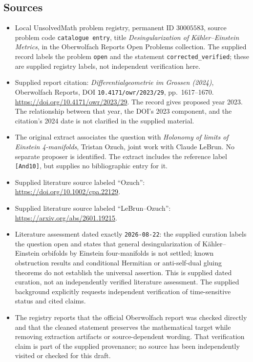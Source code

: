 \documentclass[11pt]{article}
\begin{document}
\subsection{Sources}
\begin{itemize}
\item Local UnsolvedMath problem registry, permanent ID \(30005583\), source problem code \texttt{catalogue entry}, title \emph{Desingularization of Kähler--Einstein Metrics}, in the Oberwolfach Reports Open Problems collection. The supplied record labels the problem \texttt{open} and the statement \texttt{corrected\_verified}; these are supplied registry labels, not independent verification here.
\item Supplied report citation: \emph{Differentialgeometrie im Grossen (2024)}, Oberwolfach Reports, DOI \texttt{10.4171/owr/2023/29}, pp.\ 1617--1670. \url{https://doi.org/10.4171/owr/2023/29}. The record gives proposed year 2023. The relationship between that year, the DOI's 2023 component, and the citation's 2024 date is not clarified in the supplied material.
\item The original extract associates the question with \emph{Holonomy of limits of Einstein 4-manifolds}, Tristan Ozuch, joint work with Claude LeBrun. No separate proposer is identified. The extract includes the reference label \texttt{[And10]}, but supplies no bibliographic entry for it.
\item Supplied literature source labeled ``Ozuch'': \url{https://doi.org/10.1002/cpa.22129}.
\item Supplied literature source labeled ``LeBrun--Ozuch'': \url{https://arxiv.org/abs/2601.19215}.
\item Literature assessment dated exactly \texttt{2026-08-22}: the supplied curation labels the question open and states that general desingularization of Kähler--Einstein orbifolds by Einstein four-manifolds is not settled; known obstruction results and conditional Hermitian or anti-self-dual gluing theorems do not establish the universal assertion. This is supplied dated curation, not an independently verified literature assessment. The supplied background explicitly requests independent verification of time-sensitive status and cited claims.
\item The registry reports that the official Oberwolfach report was checked directly and that the cleaned statement preserves the mathematical target while removing extraction artifacts or source-dependent wording. That verification claim is part of the supplied provenance; no source has been independently visited or checked for this draft.
\end{itemize}
\end{document}
